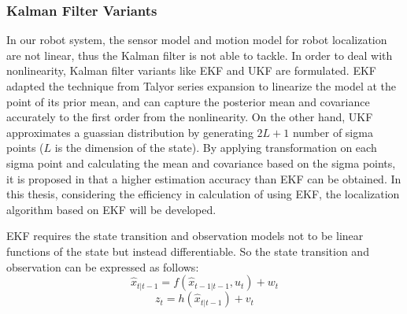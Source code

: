 \subsubsection{Kalman Filter Variants}
In our robot system, the sensor model and motion model for robot localization are not linear, thus the Kalman filter is not able to tackle. In order to deal with nonlinearity, Kalman filter variants like \gls{EKF} and \gls{UKF} are formulated. \gls{EKF} adapted the technique from Talyor series expansion to linearize the model at the point of its prior mean, and can capture the posterior mean and covariance accurately to the first order from the nonlinearity. On the other hand, \gls{UKF} approximates a guassian distribution by generating $2L+1$ number of sigma points ($L$ is the dimension of the state). By applying transformation on each sigma point and calculating the mean and covariance based on the sigma points, it is proposed in \cite{Wan2000} that a higher estimation accuracy than \gls{EKF} can be obtained. In this thesis, considering the efficiency in calculation of using \gls{EKF}, the localization algorithm based on \gls{EKF} will be developed.

\gls{EKF} requires the state transition and observation models not to be linear functions of the state but instead differentiable. So the state transition and observation can be expressed as follows: 
\begin{equation}
\hat{x}_{t|t-1} = f(\hat{x}_{t-1|t-1}, u_{t}) + w_{t} 
  \label{eq:trans}
\end{equation}
\begin{equation}
z_{t} = h(\hat{x}_{t|t-1}) + v_{t}
  \label{eq:observ}
\end{equation}

